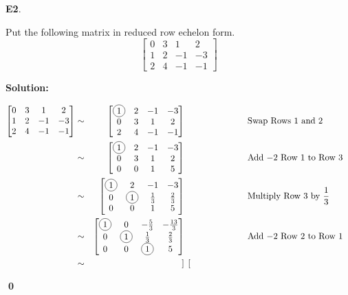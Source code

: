 \documentclass{article}
\newenvironment{problem}[1]
{
  \begin{flushleft}
  \textbf{#1}.
  \ignorespaces
}
{
  \end{flushleft}
}
\newenvironment{solution}
{
  \ignorespaces
  \textbf{Solution:}
}
{
  \ignorespacesafterend
  \begin{flushright}
  {\bfseries \qed}
  \end{flushright}
}
\begin{document}
\begin{problem}{E2}
Put the following matrix in reduced row echelon form.
\[
  \begin{bmatrix}
  0 & 3 & 1 & 2 \\
  1 & 2 & -1 & -3 \\
  2 & 4 & -1 & -1
  \end{bmatrix}
\]
\end{problem}
\begin{solution}
\begin{alignat*}{4}
  \begin{bmatrix}
  0 & 3 & 1 & 2 \\
  1 & 2 & -1 & -3 \\
  2 & 4 & -1 & -1
  \end{bmatrix}
  &\sim&
  \begin{bmatrix}
  \circledNumber{1} & 2 & -1 & -3 \\
  0 & 3 & 1 & 2 \\
  2 & 4 & -1 & -1
  \end{bmatrix} 
  &\hspace{1in} \text{Swap Rows 1 and 2}& \\
  &\sim&
  \begin{bmatrix}
  \circledNumber{1} & 2 & -1 & -3 \\
  0 & 3 & 1 & 2 \\
  0 & 0 & 1 & 5
  \end{bmatrix}
  &\hspace{1in} \text{Add \(-2\) Row 1 to Row 3}& \\
  &\sim&
  \begin{bmatrix}
  \circledNumber{1} & 2 & -1 & -3 \\
  0 & \circledNumber{1} & \frac{1}{3} & \frac{2}{3} \\
  0 & 0 & 1 & 5
  \end{bmatrix} 
  &\hspace{1in} \text{Multiply Row 3 by \(\frac{1}{3}\)}& \\
  &\sim&
  \begin{bmatrix}
  \circledNumber{1} & 0 & -\frac{5}{3} & -\frac{13}{3} \\
  0 & \circledNumber{1} & \frac{1}{3} & \frac{2}{3} \\
  0 & 0 & \circledNumber{1} & 5
  \end{bmatrix}
  &\hspace{1in} \text{Add \(-2\) Row 2 to Row 1}& \\
  &\sim&
  \begin{bmatrix}

\end{bmatrix}
\end{alignat*}
\end{solution}
\end{document}
